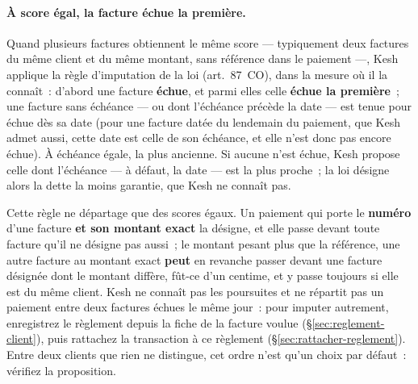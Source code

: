 \documentclass[a4paper,11pt,oneside]{article}
\begin{document}
\paragraph{À score égal, la facture échue la première.}\label{sec:imputation-score-egal} Quand plusieurs factures obtiennent le même score --- typiquement deux factures du même client et du même montant, sans référence dans le paiement ---, Kesh applique la règle d'imputation de la loi (art.~87~CO), dans la mesure où il la connaît~: d'abord une facture \textbf{échue}, et parmi elles celle \textbf{échue la première}~; une facture sans échéance --- ou dont l'échéance précède la date --- est tenue pour échue dès sa date (pour une facture datée du lendemain du paiement, que Kesh admet aussi, cette date est celle de son échéance, et elle n'est donc pas encore échue). À échéance égale, la plus ancienne. Si aucune n'est échue, Kesh propose celle dont l'échéance --- à défaut, la date --- est la plus proche~; la loi désigne alors la dette la moins garantie, que Kesh ne connaît pas.

Cette règle ne départage que des scores égaux. Un paiement qui porte le \textbf{numéro} d'une facture \textbf{et son montant exact} la désigne, et elle passe devant toute facture qu'il ne désigne pas aussi~; le montant pesant plus que la référence, une autre facture au montant exact \textbf{peut} en revanche passer devant une facture désignée dont le montant diffère, fût-ce d'un centime, et y passe toujours si elle est du même client. Kesh ne connaît pas les poursuites et ne répartit pas un paiement entre deux factures échues le même jour~: pour imputer autrement, enregistrez le règlement depuis la fiche de la facture voulue (\S\ref{sec:reglement-client}), puis rattachez la transaction à ce règlement (\S\ref{sec:rattacher-reglement}). Entre deux clients que rien ne distingue, cet ordre n'est qu'un choix par défaut~: vérifiez la proposition.
\end{document}
